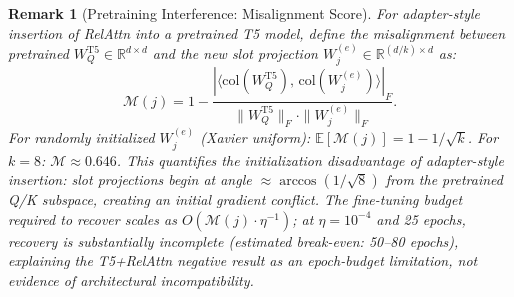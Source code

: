 \documentclass[conference]{IEEEtran}
\newtheorem{remark}{Remark}
\begin{document}
\begin{remark}[Pretraining Interference: Misalignment Score]
\label{rem:pretraining_M}
For adapter-style insertion of RelAttn into a pretrained T5 model, define the misalignment between pretrained $W_Q^{\mathrm{T5}} \in \mathbb{R}^{d \times d}$ and the new slot projection $W_j^{(e)} \in \mathbb{R}^{(d/k) \times d}$ as:
\[
\mathcal{M}(j) = 1 - \frac{|\langle \mathrm{col}(W_Q^{\mathrm{T5}}),\, \mathrm{col}(W_j^{(e)}) \rangle|_F}{\|W_Q^{\mathrm{T5}}\|_F \cdot \|W_j^{(e)}\|_F}.
\]
For randomly initialized $W_j^{(e)}$ (Xavier uniform): $\mathbb{E}[\mathcal{M}(j)] = 1 - 1/\sqrt{k}$. For $k{=}8$: $\mathcal{M} \approx 0.646$. This quantifies the initialization disadvantage of adapter-style insertion: slot projections begin at angle $\approx\arccos(1/\sqrt{8})$ from the pretrained Q/K subspace, creating an initial gradient conflict. The fine-tuning budget required to recover scales as $O(\mathcal{M}(j) \cdot \eta^{-1})$; at $\eta{=}10^{-4}$ and 25 epochs, recovery is substantially incomplete (estimated break-even: 50--80 epochs), explaining the T5+RelAttn negative result as an epoch-budget limitation, not evidence of architectural incompatibility.
\end{remark}
\end{document}
